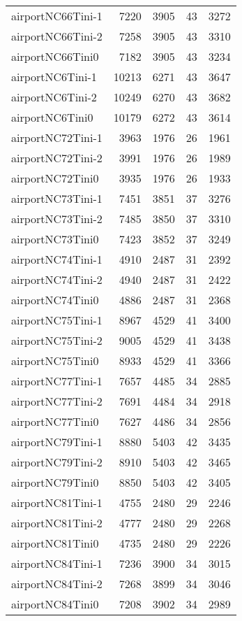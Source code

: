 \begin{longtable}{lrrrr}
airportNC66Tini-1 & 7220 & 3905 & 43 & 3272 \\
airportNC66Tini-2 & 7258 & 3905 & 43 & 3310 \\
airportNC66Tini0 & 7182 & 3905 & 43 & 3234 \\
airportNC6Tini-1 & 10213 & 6271 & 43 & 3647 \\
airportNC6Tini-2 & 10249 & 6270 & 43 & 3682 \\
airportNC6Tini0 & 10179 & 6272 & 43 & 3614 \\
airportNC72Tini-1 & 3963 & 1976 & 26 & 1961 \\
airportNC72Tini-2 & 3991 & 1976 & 26 & 1989 \\
airportNC72Tini0 & 3935 & 1976 & 26 & 1933 \\
airportNC73Tini-1 & 7451 & 3851 & 37 & 3276 \\
airportNC73Tini-2 & 7485 & 3850 & 37 & 3310 \\
airportNC73Tini0 & 7423 & 3852 & 37 & 3249 \\
airportNC74Tini-1 & 4910 & 2487 & 31 & 2392 \\
airportNC74Tini-2 & 4940 & 2487 & 31 & 2422 \\
airportNC74Tini0 & 4886 & 2487 & 31 & 2368 \\
airportNC75Tini-1 & 8967 & 4529 & 41 & 3400 \\
airportNC75Tini-2 & 9005 & 4529 & 41 & 3438 \\
airportNC75Tini0 & 8933 & 4529 & 41 & 3366 \\
airportNC77Tini-1 & 7657 & 4485 & 34 & 2885 \\
airportNC77Tini-2 & 7691 & 4484 & 34 & 2918 \\
airportNC77Tini0 & 7627 & 4486 & 34 & 2856 \\
airportNC79Tini-1 & 8880 & 5403 & 42 & 3435 \\
airportNC79Tini-2 & 8910 & 5403 & 42 & 3465 \\
airportNC79Tini0 & 8850 & 5403 & 42 & 3405 \\
airportNC81Tini-1 & 4755 & 2480 & 29 & 2246 \\
airportNC81Tini-2 & 4777 & 2480 & 29 & 2268 \\
airportNC81Tini0 & 4735 & 2480 & 29 & 2226 \\
airportNC84Tini-1 & 7236 & 3900 & 34 & 3015 \\
airportNC84Tini-2 & 7268 & 3899 & 34 & 3046 \\
airportNC84Tini0 & 7208 & 3902 & 34 & 2989 \\

\end{longtable}
